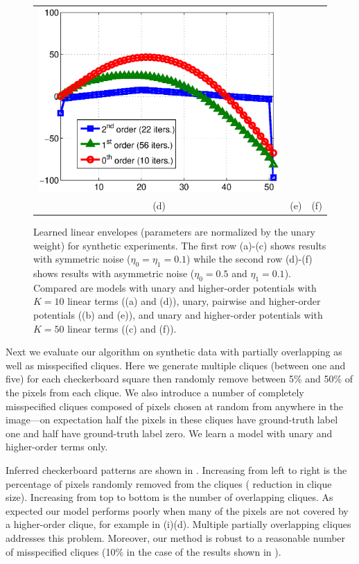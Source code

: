 \documentclass[10pt,journal,letterpaper,compsoc]{IEEEtran}
\begin{document}
\begin{figure}[t]
\begin{tabular}{ccc}
    \includegraphics[width=0.32\linewidth]{figures/synthenv4} \\
    {\small (d)} & {\small (e)} & {\small (f)}
  \end{tabular}
  \caption{\label{fig:synthetic_weights} Learned linear envelopes
    (parameters are normalized by the unary weight) for synthetic
    experiments. The first row (a)-(c) shows results with symmetric
    noise ($\eta_0 = \eta_1 = 0.1$) while the second row (d)-(f) shows
    results with asymmetric noise ($\eta_0 = 0.5$ and $\eta_1 =
    0.1$). Compared are models with unary and higher-order potentials
    with $K = 10$ linear terms ((a) and (d)), unary, pairwise and
    higher-order potentials ((b) and (e)), and unary and higher-order
    potentials with $K = 50$ linear terms ((c) and (f)).}
\end{figure}

Next we evaluate our algorithm on synthetic data with partially
overlapping as well as misspecified cliques. Here we generate multiple
cliques (between one and five) for each checkerboard square then
randomly remove between 5\% and 50\% of the pixels from each
clique. We also introduce a number of completely misspecified cliques
composed of pixels chosen at random from anywhere in the image---on
expectation half the pixels in these cliques have ground-truth label
one and half have ground-truth label zero. We learn a model with unary
and higher-order terms only.

Inferred checkerboard patterns are shown in
. Increasing from left to right is
the percentage of pixels randomly removed from the cliques (\ie
reduction in clique size). Increasing from top to bottom is the number
of overlapping cliques. As expected our model performs poorly when
many of the pixels are not covered by a higher-order clique, for
example in (i)(d). Multiple
partially overlapping cliques addresses this problem. Moreover, our
method is robust to a reasonable number of misspecified cliques (10\%
in the case of the results shown in ).
\end{document}
